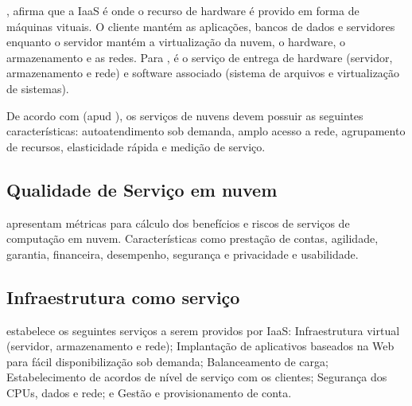 \documentclass[conference]{IEEEtran}
\begin{document}
, afirma que a IaaS é onde o recurso de hardware é provido em forma de máquinas vituais. O cliente mantém
as aplicações, bancos de dados e servidores enquanto o servidor mantém a virtualização da nuvem, o hardware, o armazenamento e as redes.
Para , é o serviço de entrega de hardware (servidor, armazenamento e rede) e software associado 
(sistema de arquivos e virtualização de sistemas).

De acordo com  (apud \cite{mell2011nist}), os serviços de nuvens devem possuir as seguintes
características: autoatendimento sob demanda, amplo acesso a rede,
agrupamento de recursos, elasticidade rápida e medição de serviço.

\subsection{Qualidade de Serviço em nuvem}




 apresentam métricas para cálculo dos benefícios e riscos
de serviços de computação em nuvem. Características como prestação de contas, agilidade,
garantia, financeira, desempenho, segurança e privacidade e usabilidade. 



\subsection{Infraestrutura como serviço}

 estabelece os seguintes serviços a serem providos 
por IaaS: Infraestrutura virtual (servidor, armazenamento e rede);
Implantação de aplicativos baseados na Web para fácil disponibilização sob demanda; Balanceamento de carga; 
Estabelecimento de acordos de nível de serviço com os clientes;  Segurança dos CPUs, dados e rede;
e Gestão e provisionamento de conta.
\end{document}
